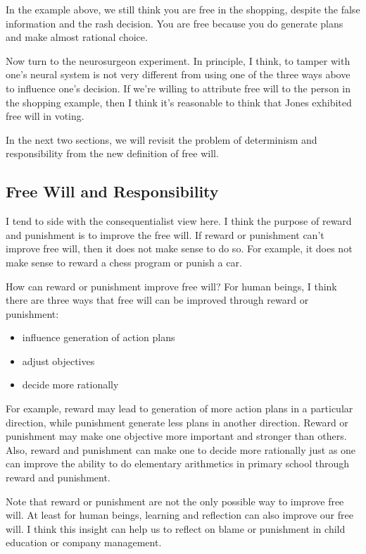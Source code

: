 In the example above, we still think you are free in the shopping, despite the false information and the rash decision. You are free because you do generate plans and make almost rational choice.

Now turn to the neurosurgeon experiment. In principle, I think, to tamper with one’s neural system is not very different from using one of the three ways above to influence one’s decision. If we’re willing to attribute free will to the person in the shopping example, then I think it’s reasonable to think that Jones exhibited free will in voting.

In the next two sections, we will revisit the problem of determinism and responsibility from the new definition of free will.

\subsection{Free Will and Responsibility}

I tend to side with the consequentialist view here. I think the purpose of reward and punishment is to improve the free will. If reward or punishment can’t improve free will, then it does not make sense to do so. For example, it does not make sense to reward a chess program or punish a car.

How can reward or punishment improve free will? For human beings, I think there are three ways that free will can be improved through reward or punishment:

\begin{itemize}
\item influence generation of action plans
\item adjust objectives
\item decide more rationally
\end{itemize}

For example, reward may lead to generation of more action plans in a particular direction, while punishment generate less plans in another direction. Reward or punishment may make one objective more important and stronger than others. Also, reward and punishment can make one to decide more rationally just as one can improve the ability to do elementary arithmetics in primary school through reward and punishment.

Note that reward or punishment are not the only possible way to improve free will. At least for human beings, learning and reflection can also improve our free will. I think this insight  can help us to reflect on blame or punishment in child education or company management.
